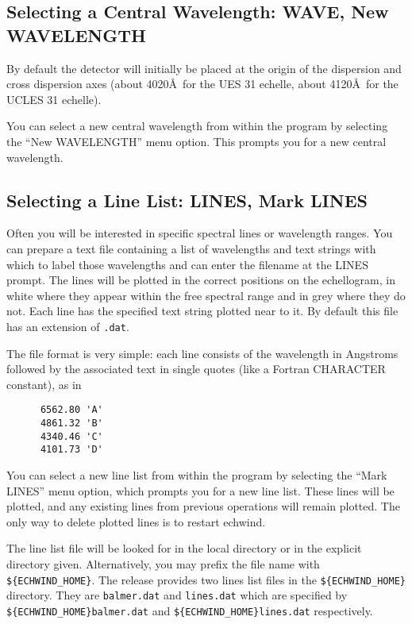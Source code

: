 \documentclass[11pt]{article}
\begin{document}
\subsection{Selecting a Central Wavelength: WAVE, New WAVELENGTH}

By default the detector will initially be placed at the origin of the
dispersion and cross dispersion axes (about 4020\AA\, for the UES 31
echelle, about 4120\AA\, for the UCLES 31 echelle). 

You can select a new central wavelength from within the program by selecting
the ``New WAVELENGTH'' menu option. This prompts you for a new central
wavelength.

\subsection{Selecting a Line List: LINES, Mark LINES}

Often you will be interested in specific spectral lines or wavelength
ranges. You can prepare a text file containing a list of wavelengths and
text strings with which to label those wavelengths and can enter the
filename at the LINES prompt. The lines will be plotted in the correct
positions on the echellogram, in white where they appear within the free
spectral range and in grey where they do not. Each line has the specified
text string plotted near to it. By default this file has an extension of
{\tt .dat}.

The file format is very simple: each line
consists of the wavelength in Angstroms followed by the associated text in
single quotes (like a Fortran CHARACTER constant), as in
\begin{verbatim}
      6562.80 'A'
      4861.32 'B'
      4340.46 'C'
      4101.73 'D'
\end{verbatim}

You can select a new line list from within the program by selecting the ``Mark 
LINES'' menu option, which prompts you for a new line list. These lines will
be plotted, and any existing lines from previous operations will remain
plotted. The only way to delete plotted lines is to restart echwind.

The line list file will be looked for in the local directory or in the explicit 
directory given. Alternatively, you may prefix the file name with
\verb+${ECHWIND_HOME}+. The release provides two lines list files in the 
\verb+${ECHWIND_HOME}+ directory. They are {\tt balmer.dat} and 
{\tt lines.dat} which are specified by 
\verb+${ECHWIND_HOME}balmer.dat+
and \verb+${ECHWIND_HOME}lines.dat+ respectively. 
\end{document}
